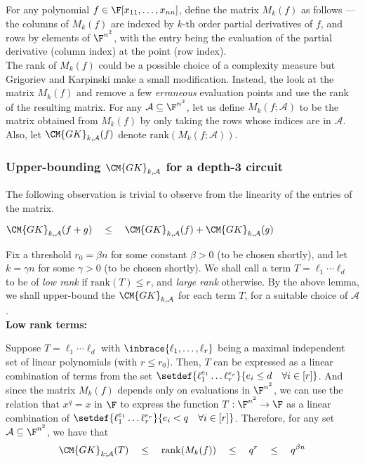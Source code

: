 For any polynomial $f \in \F[x_{11},\dots, x_{nn}]$, define the matrix
$M_k(f)$ as follows --- the columns of $M_k(f)$ are indexed by $k$-th
order partial derivatives of $f$, and rows by elements of $\F^{n^2}$,
with the entry being the evaluation of the partial derivative (column
index) at the point (row index).\\

The rank of $M_k(f)$ could be a possible choice of a complexity
measure but Grigoriev and Karpinski make a small
modification. Instead, the look at the matrix $M_k(f)$ and remove a
few \emph{erraneous} evaluation points and use the rank of the
resulting matrix. For any $\mathcal{A}\subseteq \F^{n^2}$, let us
define $M_k(f;\mathcal{A})$ to be the matrix obtained from $M_k(f)$ by
only taking the rows whose indices are in
$\mathcal{A}$. Also, let $\CM{GK}_{k,\mathcal{A}}(f)$
denote $\mathrm{rank}(M_k(f;\mathcal{A}))$.



\subsubsection{Upper-bounding $\CM{GK}_{k,\mathcal{A}}$ for a depth-3 circuit}\label{sec:gk-upper-bound}

The following observation is trivial to observe from the linearity of the entries of the matrix. 

\begin{observation}\label{obs:GK-subadditivity}
  $\CM{GK}_{k,\mathcal{A}}(f + g) \quad\leq\quad
  \CM{GK}_{k,\mathcal{A}}(f) +
  \CM{GK}_{k,\mathcal{A}}(g)$
\end{observation}

Fix a threshold $r_0 = \beta n$ for some constant $\beta > 0$ (to be
chosen shortly), and let $k = \gamma n$ for some $\gamma>0$ (to be
chosen shortly). We shall call a term $T = \ell_1\cdots \ell_d$ to be
of \emph{low rank} if $\mathrm{rank}(T) \leq r$, and \emph{large rank}
otherwise. By the above lemma, we shall upper-bound the
$\CM{GK}_{k,\mathcal{A}}$ for each term $T$, for a
suitable choice of $\mathcal{A}$.\\

\noindent 
{\bf Low rank terms:}

Suppose $T = \ell_1 \cdots \ell_d$ with $\inbrace{\ell_1, \dots,
  \ell_r}$ being a maximal independent set of linear polynomials (with
$r \leq r_0$). Then, $T$ can be expressed as a linear combination of
terms from the set $\setdef{\ell_1^{e_1}\dots \ell_r^{e_r}}{e_i\leq d
  \quad \forall i\in [r]}$. And since the matrix $M_k(f)$ depends only
on evaluations in $\F^{n^2}$, we can use the relation that $x^q = x$
in $\F$ to express the function $T:\F^{n^2}\rightarrow \F$ as a linear
combination of $\setdef{\ell_1^{e_1}\dots \ell_r^{e_r}}{e_i<q \quad
  \forall i\in [r]}$. Therefore, for any set $\mathcal{A}\subseteq
\F^{n^2}$, we have that
$$
\CM{GK}_{k;\mathcal{A}}(T) \quad \leq \quad
\mathrm{rank}(M_k(f)) \quad \leq \quad q^r \quad\leq \quad q^{\beta{n}}
$$


